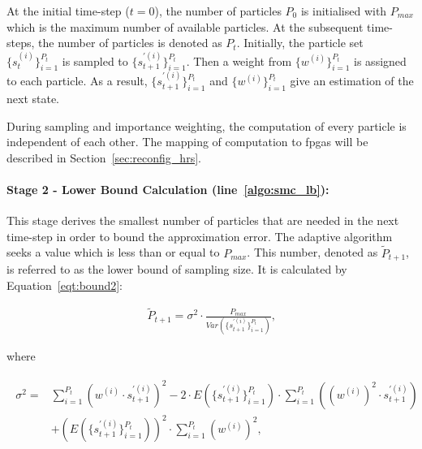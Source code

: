 At the initial time-step ($t=0$), the number of particles $P_0$ is initialised with $P_{max}$ which is the maximum number of available particles.
At the subsequent time-steps, the number of particles is denoted as $P_{t}$.
Initially, the particle set $\{s_{t}^{(i)}\}^{P_t}_{i=1}$ is sampled to $\{s_{t+1}^{'(i)}\}^{P_t}_{i=1}$.
Then a weight from $\{w^{(i)}\}^{P_t}_{i=1}$ is assigned to each particle. 
As a result, $\{s_{t+1}^{'(i)}\}^{P_t}_{i=1}$ and $\{w^{(i)}\}^{P_t}_{i=1}$ give an estimation of the next state.

During sampling and importance weighting, the computation of every particle is independent of each other. 
The mapping of computation to \glspl{fpga} will be described in Section~\ref{sec:reconfig_hrs}.

\paragraph{Stage 2 - Lower Bound Calculation (line~\ref{algo:smc_lb}): }

This stage derives the smallest number of particles that are needed in the next time-step in order to bound the approximation error.
The adaptive algorithm seeks a value which is less than or equal to $P_{max}$.
This number, denoted as $\widetilde{P}_{t+1}$, is referred to as the lower bound of sampling size.
It is calculated by Equation~\ref{eqt:bound2}:

\begin{equation}
\begin{aligned}
\widetilde{P}_{t+1} = \sigma^2 \cdot \frac{P_{max}}{Var(\{s_{t+1}^{'(i)}\}^{P_t}_{i=1})} \mbox{,}
\end{aligned}
\label{eqt:bound2}
\end{equation}

where

\begin{eqnarray}
\begin{aligned}
\sigma^2 = & \sum_{i=1}^{P_{t}}\left({w}^{(i)} \cdot s_{t+1}^{'(i)} \right)^2 - 2 \cdot E(\{s_{t+1}^{'(i)}\}^{P_t}_{i=1}) \cdot \sum_{i=1}^{P_{t}} \left ( ({w}^{(i)})^2 \cdot s_{t+1}^{'(i)} \right ) \\
& + \left(E(\{s_{t+1}^{'(i)}\}^{P_t}_{i=1})\right)^2 \cdot \sum_{i=1}^{P_{t}}({w}^{(i)})^2 \mbox{,}
\end{aligned}
\label{eqt:bound3}
\end{eqnarray}

